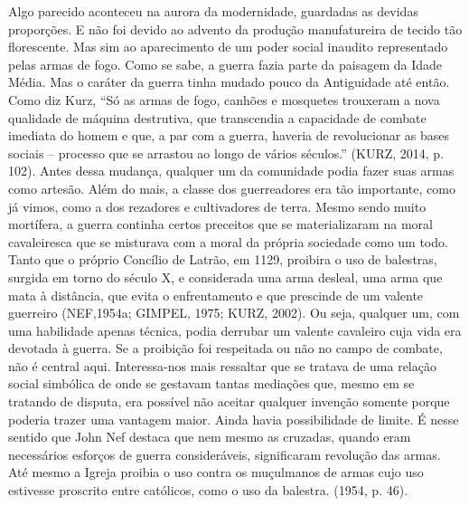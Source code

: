 Algo parecido aconteceu na aurora da modernidade, guardadas as devidas
proporções. E não foi devido ao advento da produção manufatureira de
tecido tão florescente. Mas sim ao aparecimento de um poder social
inaudito representado pelas armas de fogo. Como se sabe, a guerra fazia
parte da paisagem da Idade Média. Mas o caráter da guerra tinha mudado
pouco da Antiguidade até então. Como diz Kurz, ``Só as armas de fogo,
canhões e mosquetes trouxeram a nova qualidade de máquina destrutiva,
que transcendia a capacidade de combate imediata do homem e que, a par
com a guerra, haveria de revolucionar as bases sociais -- processo que
se arrastou ao longo de vários séculos.'' (KURZ, 2014, p. 102). Antes
dessa mudança, qualquer um da comunidade podia fazer suas armas como
artesão. Além do mais, a classe dos guerreadores era tão importante,
como já vimos, como a dos rezadores e cultivadores de terra. Mesmo sendo
muito mortífera, a guerra continha certos preceitos que se
materializaram na moral cavaleiresca que se misturava com a moral da
própria sociedade como um todo. Tanto que o próprio Concílio de Latrão,
em 1129, proibira o uso de balestras, surgida em torno do século X, e
considerada uma arma desleal, uma arma que mata à distância, que evita o
enfrentamento e que prescinde de um valente guerreiro (NEF,1954a;
GIMPEL, 1975; KURZ, 2002). Ou seja, qualquer um, com uma habilidade
apenas técnica, podia derrubar um valente cavaleiro cuja vida era
devotada à guerra. Se a proibição foi respeitada ou não no campo de
combate, não é central aqui. Interessa-nos mais ressaltar que se tratava
de uma relação social simbólica de onde se gestavam tantas mediações
que, mesmo em se tratando de disputa, era possível não aceitar qualquer
invenção somente porque poderia trazer uma vantagem maior. Ainda havia
possibilidade de limite. É nesse sentido que John Nef destaca que nem
mesmo as cruzadas, quando eram necessários esforços de guerra
consideráveis, significaram revolução das armas. Até mesmo a Igreja
proibia o uso contra os muçulmanos de armas cujo uso estivesse proscrito
entre católicos, como o uso da balestra. (1954, p. 46).

